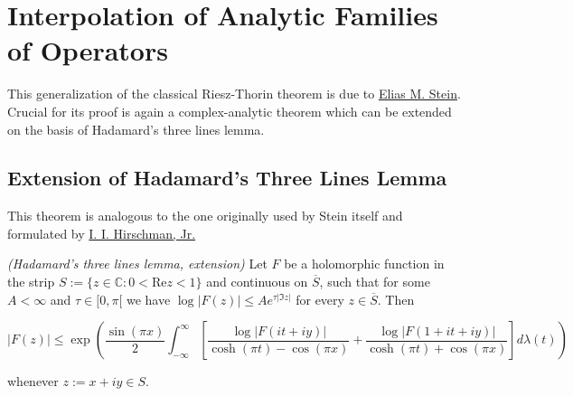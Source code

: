 \section{Interpolation of Analytic Families of Operators}
This generalization of the classical Riesz-Thorin theorem is due to \href{http://www.ams.org/journals/tran/1956-083-02/S0002-9947-1956-0082586-0/S0002-9947-1956-0082586-0.pdf}{Elias M. Stein}. Crucial for its proof is again a complex-analytic theorem which can be extended on the basis of Hadamard's three lines lemma.

\subsection{Extension of Hadamard's Three Lines Lemma}
This theorem is analogous to the one originally used by Stein itself and formulated by \href{http://download.springer.com/static/pdf/285/art\%253A10.1007\%252FBF02825637.pdf?originUrl=http\%3A\%2F\%2Flink.springer.com\%2Farticle\%2F10.1007\%2FBF02825637\&token2=exp=1470939579~acl=\%2Fstatic\%2Fpdf\%2F285\%2Fart\%25253A10.1007\%25252FBF02825637.pdf\%3ForiginUrl\%3Dhttp\%253A\%252F\%252Flink.springer.com\%252Farticle\%252F10.1007\%252FBF02825637*~hmac=d88bfe05b2cc8b0deed0f4781b8dfdd3701969606a6033727bfaf0c034cbd876}{ I. I. Hirschman, Jr.}

\vspace{2mm}

\begin{mdframed}
	\begin{lemma}\emph{(Hadamard's three lines lemma, extension)}
		Let $F$ be a holomorphic function in the strip $S := \{z \in \mathbb{C}: 0 < \mathrm{Re}z < 1\}$ and continuous on $\overline{S}$, such that for some $A < \infty$ and $\tau \in [0,\pi[$ we have $\log \vert F(z)\vert \leqslant A e^{\tau \vert \Im z \vert}$ for every $z \in \overline{S}$. Then

			\begin{equation*}
				\vert F(z) \vert \leqslant \exp\left( \frac{\sin(\pi x)}{2} \int_{-\infty}^\infty \left[ \frac{\log \vert F(it + iy)\vert}{\cosh(\pi t) - \cos(\pi x)} + \frac{\log \vert F(1 + it + iy)\vert}{\cosh(\pi t) + \cos(\pi x)} \right] d\lambda(t)\right)
			\end{equation*}

			whenever $z := x + iy \in S$.
	\end{lemma}
\end{mdframed}

